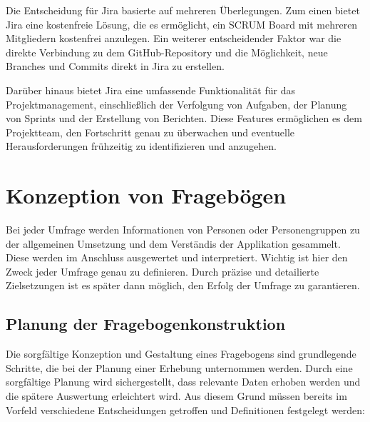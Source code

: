 Die Entscheidung für Jira basierte auf mehreren Überlegungen. Zum einen bietet Jira eine kostenfreie Lösung, die es
ermöglicht, ein SCRUM Board mit mehreren Mitgliedern kostenfrei anzulegen. Ein weiterer entscheidender Faktor war die
direkte Verbindung zu dem GitHub-Repository und die Möglichkeit, neue Branches und Commits direkt in Jira zu erstellen.

Darüber hinaus bietet Jira eine umfassende Funktionalität für das Projektmanagement, einschließlich der Verfolgung von
Aufgaben, der Planung von Sprints und der Erstellung von Berichten. Diese Features ermöglichen es dem Projektteam, den
Fortschritt genau zu überwachen und eventuelle Herausforderungen frühzeitig zu identifizieren und anzugehen.

\section{Konzeption von Fragebögen} 
Bei jeder Umfrage werden Informationen von Personen oder Personengruppen zu der allgemeinen
Umsetzung und dem Verständis der Applikation gesammelt. Diese werden im Anschluss ausgewertet und
interpretiert. Wichtig ist hier den Zweck jeder Umfrage genau zu definieren. Durch präzise und
detailierte Zielsetzungen ist es später dann möglich, den Erfolg der Umfrage zu garantieren.

\subsection{Planung der Fragebogenkonstruktion}

Die sorgfältige Konzeption und Gestaltung eines Fragebogens sind grundlegende Schritte, die bei der Planung einer Erhebung unternommen werden.
Durch eine sorgfältige Planung wird sichergestellt, dass relevante Daten erhoben werden und die spätere Auswertung erleichtert wird.
Aus diesem Grund müssen bereits im Vorfeld verschiedene Entscheidungen getroffen und Definitionen festgelegt werden:

